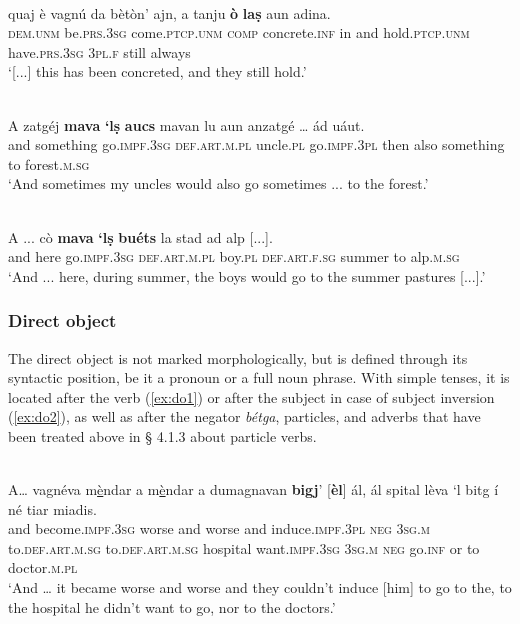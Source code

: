 \ea
\label{}
\\
\gll  [...] quaj è vagnú da bètòn’ ajn, a tanju \textbf{ò} \textbf{laṣ} aun adina. \\
{} \textsc{dem.unm} be.\textsc{prs.3sg} come.\textsc{ptcp.unm} \textsc{comp} concrete.\textsc{inf} in and hold.\textsc{ptcp.unm} have.\textsc{prs.3sg} \textsc{3pl.f} still always \\
\glt `[...] this has been concreted, and they still hold.'
\z


\ea
\label{}
\\
\gll   A zatgéj \textbf{mava} \textbf{`lṣ} \textbf{aucs} mavan lu aun anzatgé … ád uáut.\\
and something go.\textsc{impf.3sg}  \textsc{def.art.m.pl} uncle.\textsc{pl}  go.\textsc{impf.3pl} then also something {} to forest.\textsc{m.sg} \\
\glt `And sometimes my uncles would also go sometimes ... to the forest.'
\z

\ea
\label{}
\\
\gll  A ... cò \textbf{mava} \textbf{`lṣ} \textbf{buéts} la stad ad alp [...].  \\
and {} here go.\textsc{impf.3sg} \textsc{def.art.m.pl} boy.\textsc{pl} \textsc{def.art.f.sg} summer to alp.\textsc{m.sg}\\
\glt `And ... here, during summer, the boys would go to the summer pastures [...].'
\z
 

\subsubsection{Direct object}
The direct object is not marked morphologically, but is defined through its syntactic position, be it a pronoun or a full noun phrase. With simple tenses, it is located after the verb (\ref{ex:do1}) or after the subject in case of subject inversion (\ref{ex:do2}), as well as after the negator \textit{bétga}, particles, and adverbs that have been treated above in § 4.1.3 about particle verbs.

\ea
\label{ex:do1}
\\
\gll  A… vagnéva m\underline{è}ndar a m\underline{è}ndar a dumagnavan \textbf{bigj}' [\textbf{èl}] ál, ál spital lèva  `l bitg í né tiar miadis.  \\
and become.\textsc{impf.3sg} worse and worse and induce.\textsc{impf.3pl} \textsc{neg} \textsc{3sg.m} to.\textsc{def.art.m.sg} to.\textsc{def.art.m.sg} hospital want.\textsc{impf.3sg} \textsc{3sg.m} \textsc{neg} go.\textsc{inf} or to doctor.\textsc{m.pl} \\
\glt `And … it became worse and worse and they couldn’t induce [him] to go to the, to the hospital he didn’t want to go, nor to the doctors.'
\z

